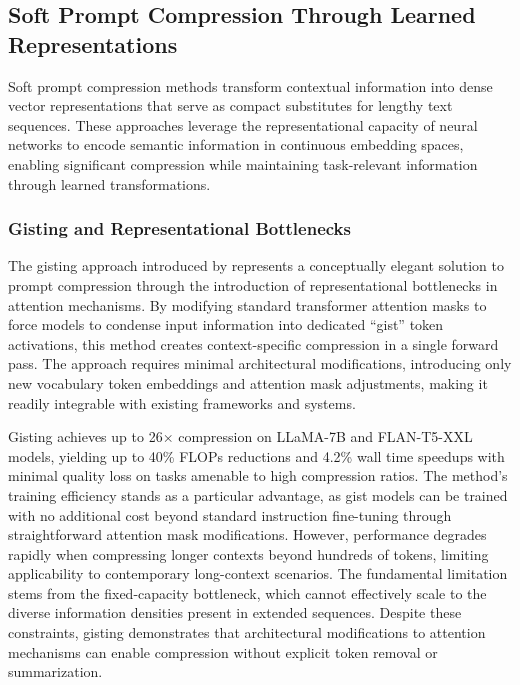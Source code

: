 \subsection{Soft Prompt Compression Through Learned Representations}

Soft prompt compression methods transform contextual information into dense vector representations that serve as compact substitutes for lengthy text sequences. These approaches leverage the representational capacity of neural networks to encode semantic information in continuous embedding spaces, enabling significant compression while maintaining task-relevant information through learned transformations.

\subsubsection{Gisting and Representational Bottlenecks}

The gisting approach introduced by \citet{mu2023learning} represents a conceptually elegant solution to prompt compression through the introduction of representational bottlenecks in attention mechanisms. By modifying standard transformer attention masks to force models to condense input information into dedicated ``gist'' token activations, this method creates context-specific compression in a single forward pass. The approach requires minimal architectural modifications, introducing only new vocabulary token embeddings and attention mask adjustments, making it readily integrable with existing frameworks and systems.

Gisting achieves up to 26$\times$ compression on LLaMA-7B and FLAN-T5-XXL models, yielding up to 40\% FLOPs reductions and 4.2\% wall time speedups with minimal quality loss on tasks amenable to high compression ratios. The method's training efficiency stands as a particular advantage, as gist models can be trained with no additional cost beyond standard instruction fine-tuning through straightforward attention mask modifications. However, performance degrades rapidly when compressing longer contexts beyond hundreds of tokens, limiting applicability to contemporary long-context scenarios. The fundamental limitation stems from the fixed-capacity bottleneck, which cannot effectively scale to the diverse information densities present in extended sequences. Despite these constraints, gisting demonstrates that architectural modifications to attention mechanisms can enable compression without explicit token removal or summarization.

